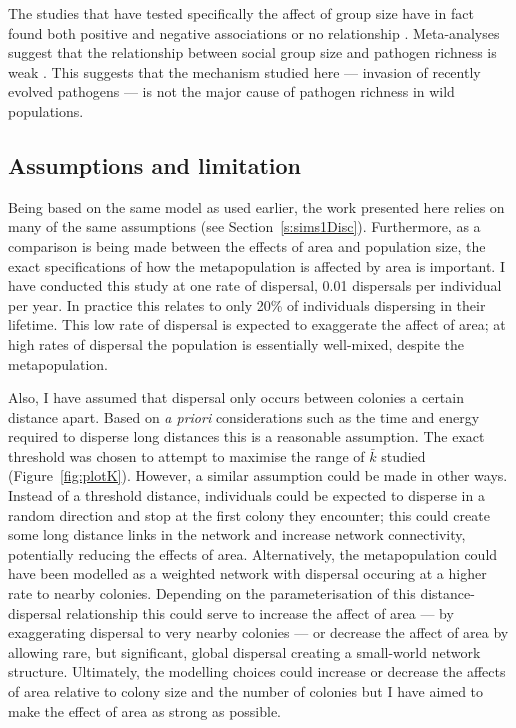 The studies that have tested specifically the affect of group size have in fact found both positive \cite{vitone2004body} and negative associations \cite{gay2014parasite} or no relationship \cite{ezenwa2006host}.
Meta-analyses suggest that the relationship between social group size and pathogen richness is weak \cite{rifkin2012animals}.
This suggests that the mechanism studied here --- invasion of recently evolved pathogens --- is not the major cause of pathogen richness in wild populations.



\subsection{Assumptions and limitation}

Being based on the same model as used earlier, the work presented here relies on many of the same assumptions (see Section~\ref{s:sims1Disc}).
Furthermore, as a comparison is being made between the effects of area and population size, the exact specifications of how the metapopulation is affected by area is important.
I have conducted this study at one rate of dispersal, 0.01 dispersals per individual per year.
In practice this relates to only 20\% of individuals dispersing in their lifetime.
This low rate of dispersal is expected to exaggerate the affect of area; at high rates of dispersal the population is essentially well-mixed, despite the metapopulation.

Also, I have assumed that dispersal only occurs between colonies a certain distance apart.
Based on \emph{a priori} considerations such as the time and energy required to disperse long distances this is a reasonable assumption.
The exact threshold was chosen to attempt to maximise the range of $\bar{k}$ studied (Figure~\ref{fig:plotK}).
However, a similar assumption could be made in other ways.
Instead of a threshold distance, individuals could be expected to disperse in a random direction and stop at the first colony they encounter; this could create some long distance links in the network and increase network connectivity, potentially reducing the effects of area.
Alternatively, the metapopulation could have been modelled as a weighted network with dispersal occuring at a higher rate to nearby colonies.
Depending on the parameterisation of this distance-dispersal relationship this could serve to increase the affect of area --- by exaggerating dispersal to very nearby colonies --- or decrease the affect of area by allowing rare, but significant, global dispersal creating a small-world network structure.
Ultimately, the modelling choices could increase or decrease the affects of area relative to colony size and the number of colonies but I have aimed to make the effect of area as strong as possible.




